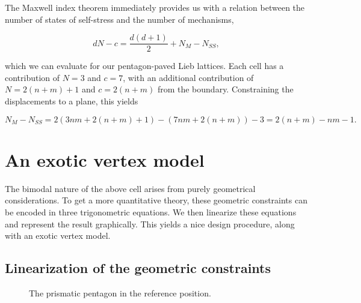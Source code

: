 	The Maxwell index theorem \cite{Indexthm} immediately provides us with a relation between the number of states of self-stress and the number of mechanisms,
			
			\begin{equation}
				dN-c = \frac{d(d+1)}{2}+N_M - N_{SS},
				\label{eq:indexthm}
			\end{equation}
			
			which we can evaluate for our pentagon-paved Lieb lattices. Each cell has a contribution of $N = 3$ and $c = 7$, with an additional contribution of $N = 2(n+m)+1$ and $c = 2(n+m)$ from the boundary. Constraining the displacements to a plane, this yields
			
			\begin{equation}
				N_M - N_{SS} = 2(3nm + 2(n+m) + 1) - (7nm + 2(n+m)) - 3 = 2(n+m) - nm - 1.
				\label{eq:periarea}
			\end{equation}


\chapter{An exotic vertex model}

	The bimodal nature of the above cell arises from purely geometrical considerations. To get a more quantitative theory, these geometric constraints can be encoded in three trigonometric equations. We then linearize these equations and represent the result graphically. This yields a nice design procedure, along with an exotic vertex model.
	
\section{Linearization of the geometric constraints}
\label{sec:derivegeometric}

			\begin{figure}[!ht]
				\caption{The prismatic pentagon in the reference position.}
				\label{fig:prismapent}
			\end{figure}
			
